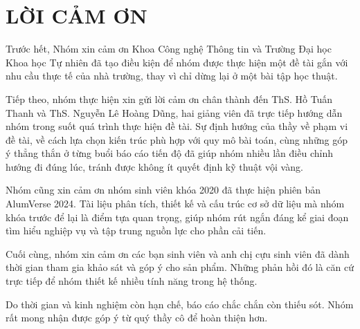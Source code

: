 \documentclass[12pt,a4paper,oneside]{report}
\begin{document}
\setcounter{page}{1}

\chapter*{LỜI CẢM ƠN}

Trước hết, Nhóm xin cảm ơn Khoa Công nghệ Thông tin và Trường Đại học Khoa học Tự nhiên đã tạo điều kiện để nhóm được thực hiện một đề tài gắn với nhu cầu thực tế của nhà trường, thay vì chỉ dừng lại ở một bài tập học thuật.

Tiếp theo, nhóm thực hiện xin gửi lời cảm ơn chân thành đến ThS. Hồ Tuấn Thanh và ThS. Nguyễn Lê Hoàng Dũng, hai giảng viên đã trực tiếp hướng dẫn nhóm trong suốt quá trình thực hiện đề tài. Sự định hướng của thầy về phạm vi đề tài, về cách lựa chọn kiến trúc phù hợp với quy mô bài toán, cùng những góp ý thẳng thắn ở từng buổi báo cáo tiến độ đã giúp nhóm nhiều lần điều chỉnh hướng đi đúng lúc, tránh được không ít quyết định kỹ thuật vội vàng.

Nhóm cũng xin cảm ơn nhóm sinh viên khóa 2020 đã thực hiện phiên bản AlumVerse 2024. Tài liệu phân tích, thiết kế và cấu trúc cơ sở dữ liệu mà nhóm khóa trước để lại là điểm tựa quan trọng, giúp nhóm rút ngắn đáng kể giai đoạn tìm hiểu nghiệp vụ và tập trung nguồn lực cho phần cải tiến.

Cuối cùng, nhóm xin cảm ơn các bạn sinh viên và anh chị cựu sinh viên đã dành thời gian tham gia khảo sát và góp ý cho sản phẩm. Những phản hồi đó là căn cứ trực tiếp để nhóm thiết kế nhiều tính năng trong hệ thống.

Do thời gian và kinh nghiệm còn hạn chế, báo cáo chắc chắn còn thiếu sót. Nhóm rất mong nhận được góp ý từ quý thầy cô để hoàn thiện hơn.

\newpage
{}
\setcounter{dcpage}{\value{page}}

\setcounter{page}{\value{dcpage}}

\newpage
\renewcommand{\cfttoctitlefont}{\fontsize{14}{21}\selectfont\bfseries}
\renewcommand{\cftaftertoctitle}{\hfill}
\renewcommand{\cftloftitlefont}{\fontsize{14}{21}\selectfont\bfseries}
\renewcommand{\cftafterloftitle}{\hfill}
\renewcommand{\cftlottitlefont}{\fontsize{14}{21}\selectfont\bfseries}
\renewcommand{\cftafterlottitle}{\hfill}
\tableofcontents
\end{document}
